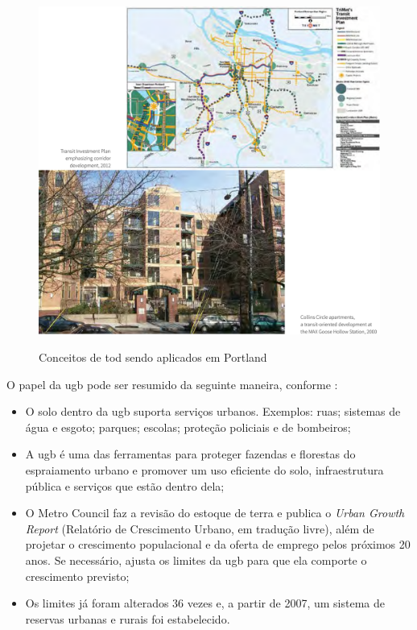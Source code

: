 	\begin{figure}
		\centering
		\caption{Conceitos de \gls{tod} sendo aplicados em Portland}
		\includegraphics[width=0.9\linewidth]{img/trimet2015a_01}
		\label{fig:todtrimet}
	\end{figure}

	O papel da \gls{ugb} pode ser resumido da seguinte maneira, conforme :

	\begin{itemize}
		\item O solo dentro da \gls{ugb} suporta serviços urbanos. Exemplos: ruas; sistemas de água e esgoto; parques; escolas; proteção policiais e de bombeiros;
		\item A \gls{ugb} é uma das ferramentas para proteger fazendas e florestas do espraiamento urbano e promover um uso eficiente do solo, infraestrutura pública e serviços que estão dentro dela;
		\item O Metro Council faz a revisão do estoque de terra e publica o \textit{Urban Growth Report} (Relatório de Crescimento Urbano, em tradução livre), além de projetar o crescimento populacional e da oferta de emprego pelos próximos 20 anos. Se necessário, ajusta os limites da \gls{ugb} para que ela comporte o crescimento previsto;
		\item Os limites já foram alterados 36 vezes e, a partir de 2007, um sistema de reservas urbanas e rurais foi estabelecido.
	\end{itemize}
	
